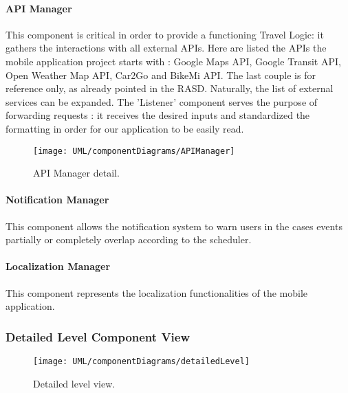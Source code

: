 	\paragraph{API Manager} 
		This component is critical in order to provide a functioning Travel Logic: it gathers the interactions with all external APIs.
		Here are listed the APIs the mobile application project starts with : Google Maps API, Google Transit API, Open Weather Map API, Car2Go and BikeMi API.
		The last couple is for reference only, as already pointed in the RASD. Naturally, the list of external services can be expanded.
		The 'Listener' component serves the purpose of forwarding requests : it receives the desired inputs and standardized the formatting in order for our application to be easily read.
	
		\begin{figure}[H]
			\centering
			\texttt{[image: UML/componentDiagrams/APIManager]}
			\caption{API Manager detail.}
			\label{APIManagerDetail}
		\end{figure}
	
	
	\paragraph{Notification Manager}
		This component allows the notification system to warn users in the cases events partially or completely overlap according to the scheduler.

	\paragraph{Localization Manager}
		This component represents the localization functionalities of the mobile application.


\subsubsection{Detailed Level Component View}

	\begin{landscape}
		\begin{figure}
			\texttt{[image: UML/componentDiagrams/detailedLevel]}
			\centering
			\caption{Detailed level view.}
			\label{detailedHighLevel}
		\end{figure}
	\end{landscape}
